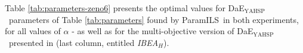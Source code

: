 \documentclass{llncs}
\newcommand{\DAEYAHSP}{{\sc DaE$_{\text{YAHSP}}$}}
\def\MULTIZENO{{\sc MultiZeno}}
\def\PARAMILS{{\sc ParamILS}}
\begin{document}
% 


Table \ref{tab:parameters-zeno6} presents the optimal values for \DAEYAHSP\ parameters of Table \ref{tab:parameters} found by \PARAMILS\ in both experiments, for all values of $\alpha$ - as well as for the multi-objective version of \DAEYAHSP\ presented in \cite{emo2013} (last column, entitled {\em IBEA$_H$}).  
\end{document}
